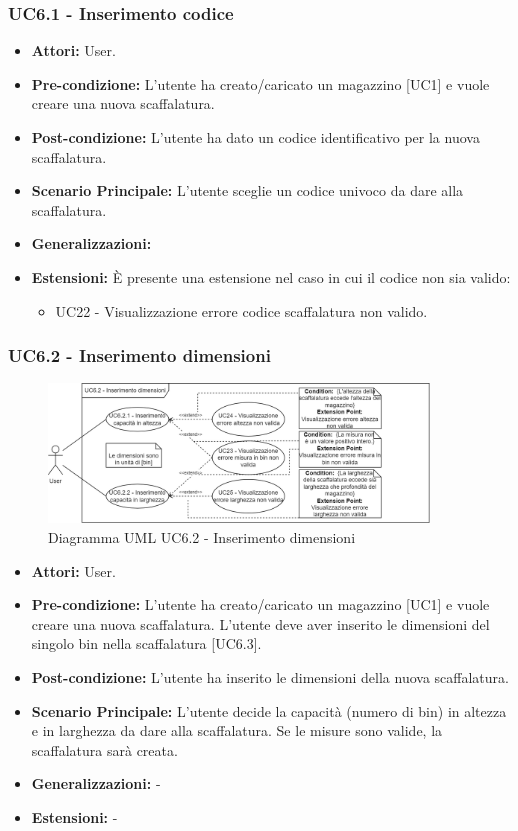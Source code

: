\subsubsection{UC6.1 - Inserimento codice}
\begin{itemize}
    \item \textbf{Attori:} User.
    \item \textbf{Pre-condizione:}  L'utente ha creato/caricato un magazzino [UC1] e vuole creare una nuova scaffalatura.
    \item \textbf{Post-condizione:} L'utente ha dato un codice identificativo per la nuova scaffalatura.
    \item \textbf{Scenario Principale:}  L'utente sceglie un codice univoco da dare alla scaffalatura.
    \item \textbf{Generalizzazioni:} 
    \item \textbf{Estensioni:} È presente una estensione nel caso in cui il codice non sia valido:
    \begin{itemize}
        \item UC22 - Visualizzazione errore codice scaffalatura non valido.
    \end{itemize}
\end{itemize}


\subsubsection{UC6.2 - Inserimento dimensioni}
\begin{figure}[H]
  \centering
  \includegraphics[width=0.9\textwidth]{UC_diagrams_1-10/UC6.2.drawio.png}
   \caption{Diagramma UML UC6.2 - Inserimento dimensioni}
\end{figure}
\begin{itemize}
    \item \textbf{Attori:} User.
    \item \textbf{Pre-condizione:} L'utente ha creato/caricato un magazzino [UC1] e vuole creare una nuova scaffalatura. L'utente deve aver inserito le dimensioni del singolo bin nella scaffalatura [UC6.3].
    \item \textbf{Post-condizione:}  L'utente ha inserito le dimensioni della nuova scaffalatura.
    \item \textbf{Scenario Principale:}  L'utente decide la capacità (numero di bin) in altezza e in larghezza da dare alla scaffalatura. Se le misure sono valide, la scaffalatura sarà creata.
    \item \textbf{Generalizzazioni:} -
    \item \textbf{Estensioni:} -
\end{itemize}


